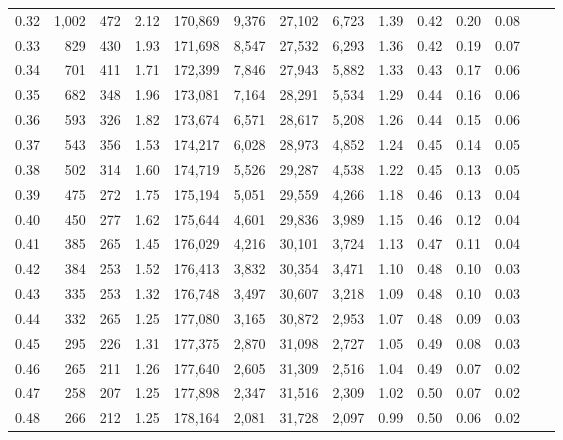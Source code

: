 \begin{tabular}{rrrrrrrrrrrrrr}
0.32 &   1,002 &    472 &    2.12 &  170,869 &    9,376 &  27,102 &   6,723 &  1.39 &  0.42 &  0.20 &      0.08 \\
0.33 &     829 &    430 &    1.93 &  171,698 &    8,547 &  27,532 &   6,293 &  1.36 &  0.42 &  0.19 &      0.07 \\
0.34 &     701 &    411 &    1.71 &  172,399 &    7,846 &  27,943 &   5,882 &  1.33 &  0.43 &  0.17 &      0.06 \\
0.35 &     682 &    348 &    1.96 &  173,081 &    7,164 &  28,291 &   5,534 &  1.29 &  0.44 &  0.16 &      0.06 \\
0.36 &     593 &    326 &    1.82 &  173,674 &    6,571 &  28,617 &   5,208 &  1.26 &  0.44 &  0.15 &      0.06 \\
0.37 &     543 &    356 &    1.53 &  174,217 &    6,028 &  28,973 &   4,852 &  1.24 &  0.45 &  0.14 &      0.05 \\
0.38 &     502 &    314 &    1.60 &  174,719 &    5,526 &  29,287 &   4,538 &  1.22 &  0.45 &  0.13 &      0.05 \\
0.39 &     475 &    272 &    1.75 &  175,194 &    5,051 &  29,559 &   4,266 &  1.18 &  0.46 &  0.13 &      0.04 \\
0.40 &     450 &    277 &    1.62 &  175,644 &    4,601 &  29,836 &   3,989 &  1.15 &  0.46 &  0.12 &      0.04 \\
0.41 &     385 &    265 &    1.45 &  176,029 &    4,216 &  30,101 &   3,724 &  1.13 &  0.47 &  0.11 &      0.04 \\
0.42 &     384 &    253 &    1.52 &  176,413 &    3,832 &  30,354 &   3,471 &  1.10 &  0.48 &  0.10 &      0.03 \\
0.43 &     335 &    253 &    1.32 &  176,748 &    3,497 &  30,607 &   3,218 &  1.09 &  0.48 &  0.10 &      0.03 \\
0.44 &     332 &    265 &    1.25 &  177,080 &    3,165 &  30,872 &   2,953 &  1.07 &  0.48 &  0.09 &      0.03 \\
0.45 &     295 &    226 &    1.31 &  177,375 &    2,870 &  31,098 &   2,727 &  1.05 &  0.49 &  0.08 &      0.03 \\
0.46 &     265 &    211 &    1.26 &  177,640 &    2,605 &  31,309 &   2,516 &  1.04 &  0.49 &  0.07 &      0.02 \\
0.47 &     258 &    207 &    1.25 &  177,898 &    2,347 &  31,516 &   2,309 &  1.02 &  0.50 &  0.07 &      0.02 \\
0.48 &     266 &    212 &    1.25 &  178,164 &    2,081 &  31,728 &   2,097 &  0.99 &  0.50 &  0.06 &      0.02 \\

\end{tabular}
